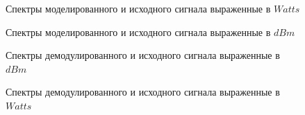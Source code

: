 \documentclass[a4paper,14pt]{extarticle}
\begin{document}
\begin{figure}[H]
\caption{Спектры моделированного и исходного сигнала выраженные в $Watts$}
\label{304}
\end{figure}

\begin{figure}[H]
\caption{Спектры моделированного и исходного сигнала выраженные в $dBm$}
\label{305}
\end{figure}

\begin{figure}[H]
\caption{Спектры демодулированного и исходного сигнала выраженные в $dBm$}
\label{011}
\end{figure}

\begin{figure}[H]
\caption{Спектры демодулированного и исходного сигнала выраженные в $Watts$}
\label{012}
\end{figure}
\end{document}
